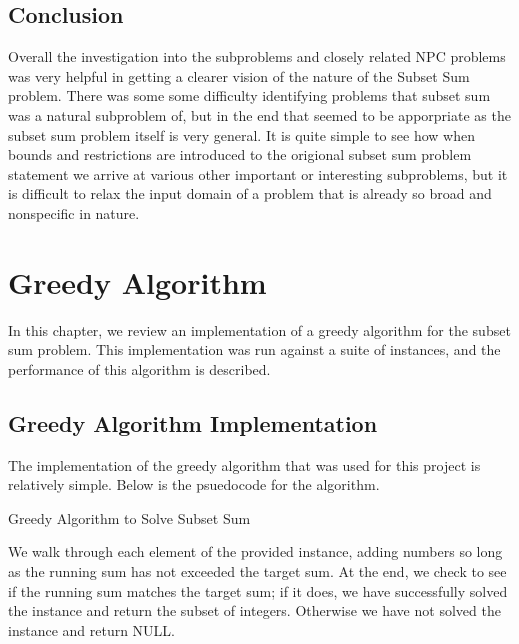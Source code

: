 \documentclass{report}
\begin{document}
\section{Conclusion}

Overall the investigation into the subproblems and closely related NPC problems was very helpful in getting a clearer vision of
the nature of the Subset Sum problem. There was some some difficulty identifying problems that
subset sum was a natural subproblem of, but in the end that seemed to be apporpriate as the subset sum problem itself is very general.
It is quite simple to see how when bounds and restrictions are introduced to the origional subset sum problem statement we arrive at
various other important or interesting subproblems, but it is difficult to relax the input domain of a problem that is already so
broad and nonspecific in nature. 

\chapter{Greedy Algorithm}
In this chapter, we review an implementation of a greedy algorithm
for the subset sum problem. This implementation was run against a suite of instances, and the
performance of this algorithm is described.

\section{Greedy Algorithm Implementation}
The implementation of the greedy algorithm that was used for this project is relatively simple.
Below is the psuedocode for the algorithm.

\begin{algorithm}
  \caption{Greedy Algorithm to Solve Subset Sum}
  \label{greedy}
  \begin{algorithmic}
     
    \ENDIF
    \ENDFOR
    \ELSE
    \ENDIF
  \end{algorithmic}
\end{algorithm}

We walk through each element of the provided instance, adding numbers so long
as the running sum has not exceeded the target sum. At the end, we check to see
if the running sum matches the target sum; if it does, we have successfully solved
the instance and return the subset of integers. Otherwise we have not solved the instance
and return NULL.
\end{document}
